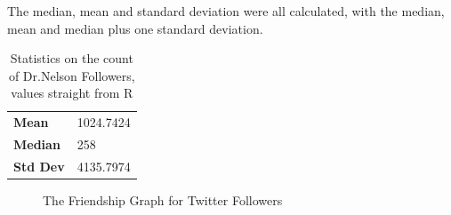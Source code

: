 

\clearpage
The median, mean and standard deviation were all calculated, with the median, mean and median plus one standard deviation.
\vspace*{2mm}
\begin{table}
\centering
\begin{tabular}{ l l }
\hline
\textbf{Mean} & 1024.7424 \\
\textbf{Median} & 258 \\
\textbf{Std Dev} & 4135.7974\\
\hline
\end{tabular}
\caption{Statistics on the count of Dr.Nelson Followers, values straight from R}
\label{tab:q1stats}
\end{table}
\begin{figure}[h!]
\centering
{}
\caption{The Friendship Graph for Twitter Followers}
\label{fig:followers_graph}
\end{figure}


